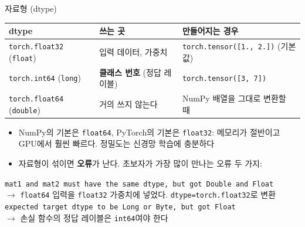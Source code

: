 \documentclass[aspectratio=169,11pt]{beamer}
\newcommand{\code}[1]{\texttt{#1}}
\begin{document}
\begin{frame}{자료형 (dtype)}
\centering
\footnotesize
\renewcommand{\arraystretch}{1.2}
\begin{tabular}{lll}
\toprule
\textbf{dtype} & \textbf{쓰는 곳} & \textbf{만들어지는 경우} \\
\midrule
\code{torch.float32} (\code{float}) & 입력 데이터, 가중치 & \code{torch.tensor([1., 2.])} (기본값) \\
\code{torch.int64} (\code{long}) & \textbf{클래스 번호} (정답 레이블) & \code{torch.tensor([3, 7])} \\
\code{torch.float64} (\code{double}) & 거의 쓰지 않는다 & NumPy 배열을 그대로 변환할 때 \\
\bottomrule
\end{tabular}
\vskip2mm
\raggedright
\small
\begin{itemize}
\item NumPy의 기본은 \code{float64}, PyTorch의 기본은 \code{float32}: 메모리가 절반이고 GPU에서 훨씬 빠르다. 정밀도는 신경망 학습에 충분하다
\item 자료형이 섞이면 \textbf{오류}가 난다. 초보자가 가장 많이 만나는 오류 두 가지:
\end{itemize}
\begin{remarkbox}[자주 보는 오류]
\footnotesize
\code{mat1 and mat2 must have the same dtype, but got Double and Float}\\
\quad $\to$ \code{float64} 입력을 \code{float32} 가중치에 넣었다. \code{dtype=torch.float32}로 변환\\[0.5mm]
\code{expected target dtype to be Long or Byte, but got Float}\\
\quad $\to$ 손실 함수의 정답 레이블은 \code{int64}여야 한다
\end{remarkbox}
\end{frame}
\end{document}
